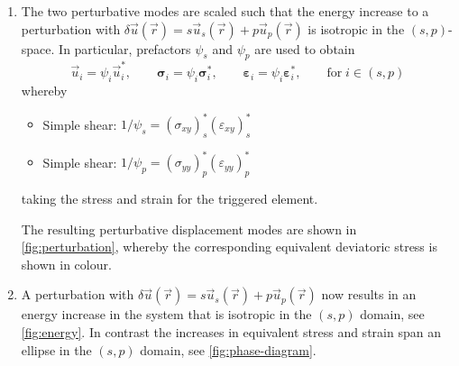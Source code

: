\documentclass[fleqn]{goose-article}
\begin{document}
\begin{enumerate}
    \item The two perturbative modes are scaled such that the energy increase to a perturbation
    with $\delta \vec{u}(\vec{r}) = s \vec{u}_s (\vec{r}) + p \vec{u}_p (\vec{r})$ is isotropic in
    the $(s, p)$-space.
    In particular, prefactors $\psi_s$ and $\psi_p$ are used to obtain
    \begin{equation}
        \vec{u}_i = \psi_i \vec{u}^*_i, \qquad
        \bm{\sigma}_i = \psi_i \bm{\sigma}^*_i, \qquad
        \bm{\varepsilon}_i = \psi_i \bm{\varepsilon}^*_i, \qquad
        \text{for}\; i \in (s, p)
    \end{equation}
    whereby
    \begin{itemize}
        \item Simple shear:
        $1 / \psi_s = (\sigma_{xy})^*_s (\varepsilon_{xy})^*_s$


        \item Simple shear:
        $1 / \psi_p = (\sigma_{yy})^*_p (\varepsilon_{yy})^*_p$
    \end{itemize}
    taking the stress and strain for the triggered element.

    The resulting perturbative displacement modes
    are shown in \cref{fig:perturbation},
    whereby the corresponding equivalent deviatoric stress is shown in colour.

    \item A perturbation with
    $\delta \vec{u}(\vec{r}) = s \vec{u}_s (\vec{r}) + p \vec{u}_p (\vec{r})$
    now results in an energy increase in the system that is isotropic in the $(s, p)$ domain,
    see \cref{fig:energy}.
    In contrast the increases in equivalent stress and strain span an ellipse
    in the $(s, p)$ domain, see \cref{fig:phase-diagram}.

\end{enumerate}
\end{document}
